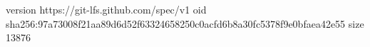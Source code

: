 version https://git-lfs.github.com/spec/v1
oid sha256:97a73008f21aa89d6d52f63324658250c0acfd6b8a30fc5378f9e0bfaea42e55
size 13876
